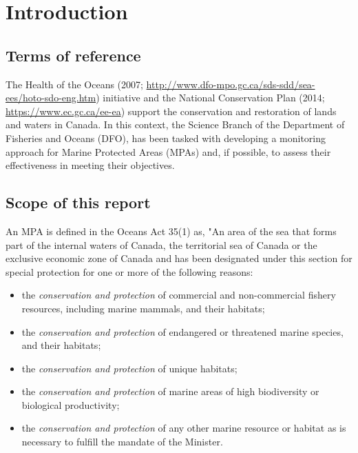 \documentclass[letterpaper,portrait,11pt]{scrartcl}
\numberwithin{equation}{section}    %
\numberwithin{figure}{section}    %
\numberwithin{table}{section}       %
\begin{document}

\newpage
{}
\setcounter{page}{1}

\section{Introduction}

\subsection{Terms of reference}
The Health of the Oceans (2007; \url{http://www.dfo-mpo.gc.ca/sds-sdd/sea-ees/hoto-sdo-eng.htm}) initiative and the National Conservation Plan (2014; \url{https://www.ec.gc.ca/ee-ea}) support the conservation and restoration of lands and waters in Canada. In this context, the Science Branch of the Department of Fisheries and Oceans (DFO), has been tasked with developing a monitoring approach for Marine Protected Areas (MPAs) and, if possible, to assess their effectiveness in meeting their objectives. 

\subsection{Scope of this report}
An MPA is defined in the Oceans Act 35(1) as, "An area of the sea that forms part of the internal waters of Canada, the territorial sea of Canada or the exclusive economic zone of Canada and has been designated under this section for special protection for one or more of the following reasons: 

\begin{itemize}
  \item the \textit{conservation and protection} of commercial and non-commercial fishery resources, including marine mammals, and their habitats; 
  \item the \textit{conservation and protection} of endangered or threatened marine species, and their habitats; 
  \item the \textit{conservation and protection} of unique habitats; 
  \item the \textit{conservation and protection} of marine areas of high biodiversity or biological productivity; 
  \item the \textit{conservation and protection} of any other marine resource or habitat as is necessary to fulfill the mandate of the Minister.
\end{itemize}
\end{document}

